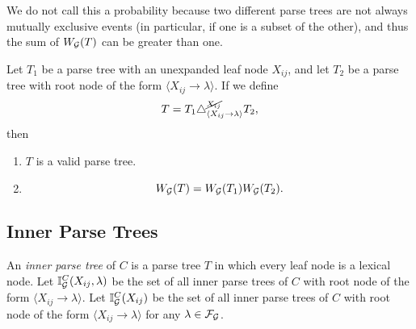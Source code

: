 \documentclass{article}
\newcommand\Inner{\mathbb{I}}
\begin{document}
We do not call this a probability because two different parse trees
are not always mutually exclusive events (in particular, if one is a
subset of the other), and thus the sum of $W_{{\mathcal G}}(T)$ can be greater
than one.

\begin{obs}
Let $T_1$ be a parse tree with an unexpanded leaf node $X_{ij}$, and let
$T_2$ be a parse tree with root node of the form $\langle X_{ij} \to
\lambda \rangle$. If we define
$$T = T_1 \triangle^{\cancel{X_{ij}}}_{\langle X_{ij} \to \lambda
  \rangle} T_2,$$
then
\begin{enumerate}
\item $T$ is a valid parse tree.
\item $$W_{{\mathcal G}}(T) = W_{{\mathcal G}}(T_1) W_{{\mathcal G}}(T_2).$$
\end{enumerate}
\end{obs}

\subsection{Inner Parse Trees}

\begin{defn}
  An \emph{inner parse tree} of $C$ is a parse tree $T$ in which every
  leaf node is a lexical node. Let $\Inner_\GGG^C(X_{ij}, \lambda)$ be
  the set of all inner parse trees of $C$ with root node of the form
  $\langle X_{ij} \to \lambda \rangle$. Let $\Inner_\GGG^C(X_{ij})$ be
  the set of all inner parse trees of $C$ with root node of the form
  $\langle X_{ij} \to \lambda \rangle$ for any $\lambda \in {\mathcal F}_{{\mathcal G}}$.
\end{defn}
\end{document}
